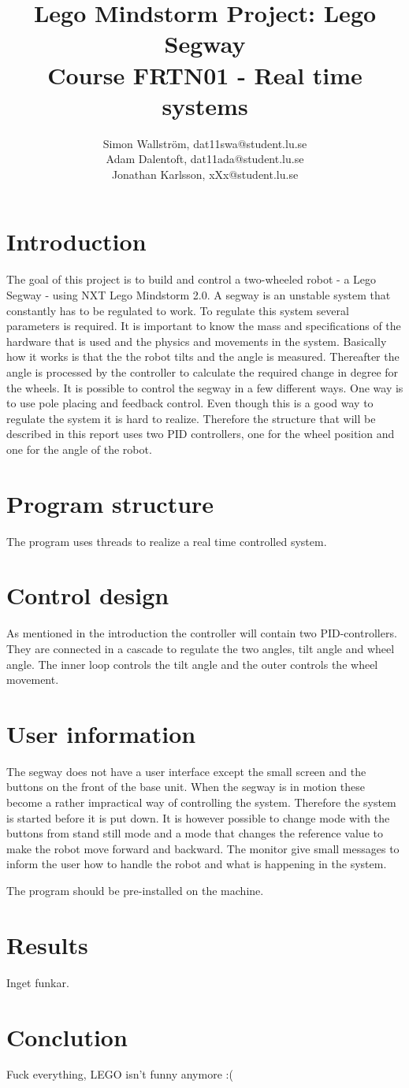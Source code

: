 \documentclass[a4paper]{article}
\title{Lego Mindstorm Project: Lego Segway\\
Course FRTN01 - Real time systems}
\author{Simon Wallström, dat11swa@student.lu.se\\
Adam Dalentoft, dat11ada@student.lu.se\\
Jonathan Karlsson, xXx@student.lu.se}
\begin{document}

\maketitle
\thispagestyle{empty}
\newpage
\setcounter{page}{1}
\tableofcontents
\newpage
\section{Introduction}
The goal of this project is to build and control a two-wheeled robot - a Lego Segway - using NXT Lego Mindstorm 2.0. A segway is an unstable system that constantly has to be regulated to work. To regulate this system several parameters is required. It is important to know the mass and specifications of the hardware that is used and the physics and movements in the system. Basically how it works is that the the robot tilts and the angle is measured. Thereafter the angle is processed by the controller to calculate the required change in degree for the wheels. It is possible to control the segway in a few different ways. One way is to use pole placing and feedback control. Even though this is a good way to regulate the system it is hard to realize. Therefore the structure that will be described in this report uses two PID controllers, one for the wheel position and one for the angle of the robot.


\section{Program structure}
The program uses threads to realize a real time controlled system. 


\section{Control design}
As mentioned in the introduction the controller will contain two PID-controllers. They are connected in a cascade to regulate the two angles, tilt angle and wheel angle. The inner loop controls the tilt angle and the outer controls the wheel movement. 

\section{User information}
The segway does not have a user interface except the small screen and the buttons on the front of the base unit. When the segway is in motion these become a rather impractical way of controlling the system. Therefore the system is started before it is put down. It is however possible to change mode with the buttons from stand still mode and a mode that changes the reference value to make the robot move forward and backward. The monitor give small messages to inform the user how to handle the robot and what is happening in the system.

The program should be pre-installed on the machine.

\section{Results}
Inget funkar.


\section{Conclution}
Fuck everything, LEGO isn’t funny anymore :(
\end{document}
